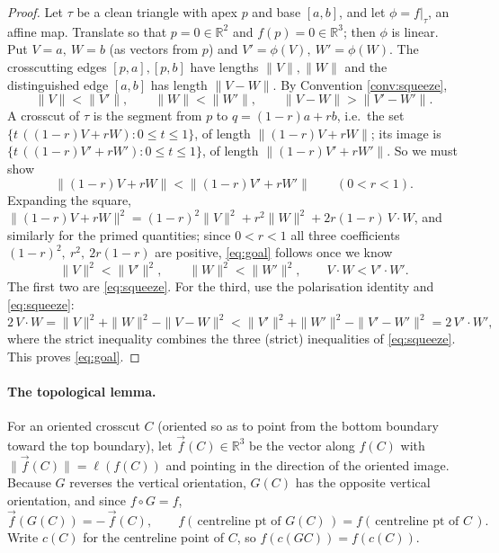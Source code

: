 \documentclass[12pt]{article}
\newcommand{\R}{\mathbb{R}}
\begin{document}
\begin{proof}
Let $\tau$ be a clean triangle with apex $p$ and base $[a,b]$, and let
$\phi=f|_\tau$, an affine map. Translate so that $p=0\in\R^2$ and
$f(p)=0\in\R^3$; then $\phi$ is linear. Put $V=a,\ W=b$ (as vectors from
$p$) and $V'=\phi(V),\ W'=\phi(W)$. The crosscutting edges $[p,a],[p,b]$
have lengths $\|V\|,\|W\|$ and the distinguished edge $[a,b]$ has length
$\|V-W\|$. By Convention \ref{conv:squeeze},
\begin{equation}\label{eq:squeeze}
\|V\|<\|V'\|,\qquad \|W\|<\|W'\|,\qquad \|V-W\|>\|V'-W'\|.
\end{equation}
A crosscut of $\tau$ is the segment from $p$ to $q=(1-r)a+rb$, i.e.\ the
set $\{t\,((1-r)V+rW):0\le t\le1\}$, of length $\|(1-r)V+rW\|$; its
image is $\{t\,((1-r)V'+rW'):0\le t\le1\}$, of length
$\|(1-r)V'+rW'\|$. So we must show
\begin{equation}\label{eq:goal}
\|(1-r)V+rW\|<\|(1-r)V'+rW'\|\qquad(0<r<1).
\end{equation}
Expanding the square,
$\|(1-r)V+rW\|^2=(1-r)^2\|V\|^2+r^2\|W\|^2+2r(1-r)\,V\!\cdot\!W$,
and similarly for the primed quantities; since $0<r<1$ all three
coefficients $(1-r)^2,\ r^2,\ 2r(1-r)$ are positive, \eqref{eq:goal}
follows once we know
\[
\|V\|^2<\|V'\|^2,\qquad \|W\|^2<\|W'\|^2,\qquad V\!\cdot\!W<V'\!\cdot\!W'.
\]
The first two are \eqref{eq:squeeze}. For the third, use the polarisation
identity and \eqref{eq:squeeze}:
\[
2\,V\!\cdot\!W=\|V\|^2+\|W\|^2-\|V-W\|^2
<\|V'\|^2+\|W'\|^2-\|V'-W'\|^2=2\,V'\!\cdot\!W',
\]
where the strict inequality combines the three (strict) inequalities of
\eqref{eq:squeeze}. This proves \eqref{eq:goal}.
\end{proof}

\paragraph{The topological lemma.}
For an oriented crosscut $C$ (oriented so as to point from the bottom
boundary toward the top boundary), let $\overrightarrow f(C)\in\R^3$ be
the vector along $f(C)$ with $\|\overrightarrow f(C)\|=\ell(f(C))$ and
pointing in the direction of the oriented image. Because $G$ reverses the
vertical orientation, $G(C)$ has the opposite vertical orientation, and
since $f\circ G=f$,
\begin{equation}\label{eq:odd-vec}
\overrightarrow f(G(C))=-\,\overrightarrow f(C),\qquad
f(\,\text{centreline pt of }G(C)\,)=f(\,\text{centreline pt of }C\,).
\end{equation}
Write $c(C)$ for the centreline point of $C$, so $f(c(GC))=f(c(C))$.
\end{document}
